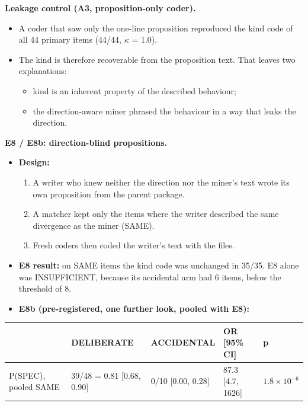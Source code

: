 \documentclass[acmsmall,screen,review,anonymous]{acmart}
\begin{document}
\textbf{Leakage control (A3, proposition-only coder).}
\begin{itemize}
\item A coder that saw only the one-line proposition reproduced the kind code of all 44 primary items (44/44, $\kappa$ = 1.0).
\item The kind is therefore recoverable from the proposition text. That leaves two explanations:
\begin{itemize}
\item kind is an inherent property of the described behaviour;
\item the direction-aware miner phrased the behaviour in a way that leaks the direction.
\end{itemize}
\end{itemize}

\textbf{E8 / E8b: direction-blind propositions.}
\begin{itemize}
\item \textbf{Design:}
\begin{enumerate}
\item A writer who knew neither the direction nor the miner's text wrote its own proposition from the parent package.
\item A matcher kept only the items where the writer described the same divergence as the miner (SAME).
\item Fresh coders then coded the writer's text with the files.
\end{enumerate}
\item \textbf{E8 result:} on SAME items the kind code was unchanged in 35/35. E8 alone was INSUFFICIENT, because its accidental arm had 6 items, below the threshold of 8.
\item \textbf{E8b (pre-registered, one further look, pooled with E8):}
\end{itemize}

\begin{table}[t]
\small
\begin{tabularx}{\linewidth}{lXXXX}
\toprule
 & DELIBERATE & ACCIDENTAL & OR [95\% CI] & p \\
\midrule
P(SPEC), pooled SAME & 39/48 = 0.81 [0.68, 0.90] & 0/10 [0.00, 0.28] & 87.3 [4.7, 1626] & $1.8 \times 10^{-6}$ \\
\bottomrule
\end{tabularx}
\end{table}
\end{document}
